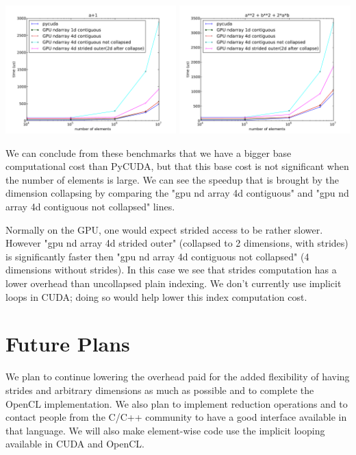 \documentclass{article} %
\begin{document}
\includegraphics[width=0.495\textwidth]{ap1_no_alloc}
\includegraphics[width=0.495\textwidth]{a2pb2p2ab_no_alloc}

We can conclude from these benchmarks that we have a bigger base computational cost than PyCUDA, but that this base cost is not significant when the number of elements is large.
We can see the speedup that is brought by the dimension collapsing by comparing the "gpu nd array 4d contiguous" and "gpu nd array 4d contiguous not collapsed" lines.

Normally on the GPU, one would expect strided access to be rather slower.
However "gpu nd array 4d strided outer" (collapsed to 2 dimensions, with strides) is significantly faster then "gpu nd array 4d contiguous not collapsed" (4 dimensions without strides).
In this case we see that strides computation has a lower overhead than uncollapsed plain indexing.
We don't currently use implicit loops in CUDA; doing so would help lower this index computation cost.

\section{Future Plans}

We plan to continue lowering the overhead paid for the added flexibility of having strides and arbitrary dimensions 
as much as possible and to complete the OpenCL implementation.
We also plan to implement reduction operations and to contact people from the C/C++ community to have a good interface available in that language.
We will also make element-wise code use the implicit looping available in CUDA and OpenCL.
\end{document}
